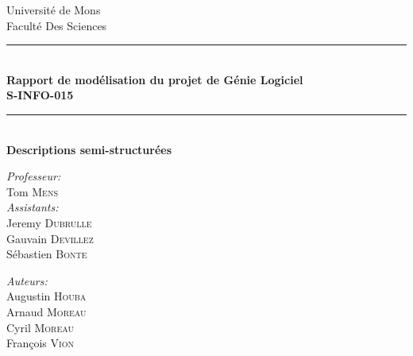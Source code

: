 \begin{titlepage}
    \begin{center}
        
        {\Large Université de Mons}\\[1ex]
        {\Large Faculté Des Sciences}\\[1ex]
        
        \newcommand{\HRule}{\rule{\linewidth}{0.3mm}}
        \HRule \\[0.3cm]
        { \LARGE \bfseries Rapport de modélisation du projet de Génie Logiciel \\[0.3cm]}
        { \LARGE \bfseries S-INFO-015 \\[0.1cm]} %
        \HRule \\[1cm]
        
        \LARGE \bfseries Descriptions semi-structurées\\
        \vspace{1.5cm}
        \begin{minipage}[t]{0.45\textwidth}
            \begin{flushleft} \large
                \emph{Professeur:}\\
                Tom \textsc{Mens}\\
                \emph{Assistants:}\\
                Jeremy \textsc{Dubrulle}\\
                Gauvain \textsc{Devillez}\\
                Sébastien \textsc{Bonte}
            \end{flushleft}
        \end{minipage}
        \begin{minipage}[t]{0.45\textwidth}
            \begin{flushright} \large
                \emph{Auteurs:} \\
                Augustin \textsc{Houba} \\
                Arnaud \textsc{Moreau} \\
                Cyril \textsc{Moreau} \\
                François \textsc{Vion}
            \end{flushright}
        \end{minipage}\\[2ex]
        
        \vfill
        

\end{center}
\end{titlepage}
